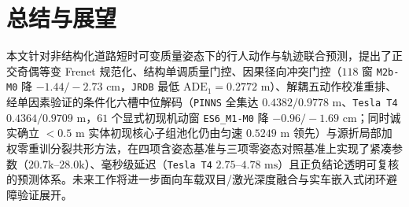 \documentclass[UTF8,a4paper,12pt,openany,oneside]{ctexrep}
\begin{document}
\chapter{总结与展望}
本文针对非结构化道路短时可变质量姿态下的行人动作与轨迹联合预测，提出了正交奇偶等变 Frenet 规范化、结构单调质量门控、因果径向冲突门控（$118$ 窗 \texttt{M2b-M0} 降 $-1.44/-2.73\text{ cm}$，\texttt{JRDB} 最低 $\text{ADE}_1 = 0.2772\text{ m}$）、解耦五动作校准重排、经单因素验证的条件化六槽中位解码（\texttt{PINNS} 全集达 $0.4382 / 0.9778\text{ m}$、\texttt{Tesla T4} $0.4364 / 0.9709\text{ m}$，$61$ 个显式初现机动窗 \texttt{ES6\_M1-M0} 降 $-0.96/-1.69\text{ cm}$；同时诚实确立 $<0.5\text{ m}$ 实体初现核心子组池化仍由匀速 $0.5249\text{ m}$ 领先）与源折局部加权零重训分裂共形方法，在四项含姿态基准与三项零姿态对照基准上实现了紧凑参数（$20.7\text{k}\text{--}28.0\text{k}$）、毫秒级延迟（\texttt{Tesla T4} $2.75\text{--}4.78\text{ ms}$）且正负结论透明可复核的预测体系。未来工作将进一步面向车载双目/激光深度融合与实车嵌入式闭环避障验证展开。



\end{document}
